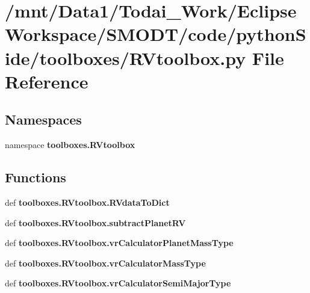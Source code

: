 \section{/mnt/\-Data1/\-Todai\-\_\-\-Work/\-Eclipse\-Workspace/\-S\-M\-O\-D\-T/code/python\-Side/toolboxes/\-R\-Vtoolbox.py File Reference}
\label{_r_vtoolbox_8py}
\subsection*{Namespaces}
\begin{DoxyCompactItemize}
\item 
namespace {\bf toolboxes.\-R\-Vtoolbox}
\end{DoxyCompactItemize}
\subsection*{Functions}
\begin{DoxyCompactItemize}
\item 
def {\bf toolboxes.\-R\-Vtoolbox.\-R\-Vdata\-To\-Dict}
\item 
def {\bf toolboxes.\-R\-Vtoolbox.\-subtract\-Planet\-R\-V}
\item 
def {\bf toolboxes.\-R\-Vtoolbox.\-vr\-Calculator\-Planet\-Mass\-Type}
\item 
def {\bf toolboxes.\-R\-Vtoolbox.\-vr\-Calculator\-Mass\-Type}
\item 
def {\bf toolboxes.\-R\-Vtoolbox.\-vr\-Calculator\-Semi\-Major\-Type}
\end{DoxyCompactItemize}
